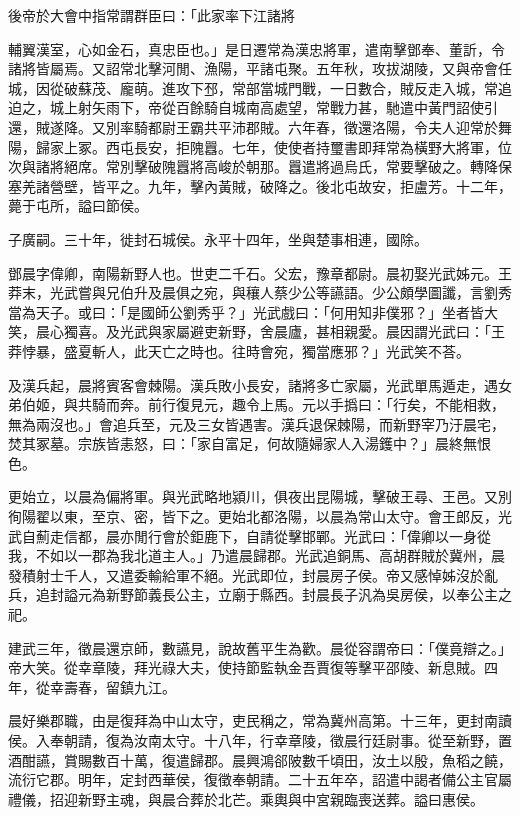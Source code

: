 \begin{pinyinscope}
後帝於大會中指常謂群臣曰：「此家率下江諸將

輔翼漢室，心如金石，真忠臣也。」是日遷常為漢忠將軍，遣南擊鄧奉、董訢，令諸將皆屬焉。又詔常北擊河閒、漁陽，平諸屯聚。五年秋，攻拔湖陵，又與帝會任城，因從破蘇茂、龐萌。進攻下邳，常部當城門戰，一日數合，賊反走入城，常追迫之，城上射矢雨下，帝從百餘騎自城南高處望，常戰力甚，馳遣中黃門詔使引還，賊遂降。又別率騎都尉王霸共平沛郡賊。六年春，徵還洛陽，令夫人迎常於舞陽，歸家上冢。西屯長安，拒隗囂。七年，使使者持璽書即拜常為橫野大將軍，位次與諸將絕席。常別擊破隗囂將高峻於朝那。囂遣將過烏氏，常要擊破之。轉降保塞羌諸營壁，皆平之。九年，擊內黃賊，破降之。後北屯故安，拒盧芳。十二年，薨于屯所，謚曰節侯。

子廣嗣。三十年，徙封石城侯。永平十四年，坐與楚事相連，國除。

鄧晨字偉卿，南陽新野人也。世吏二千石。父宏，豫章都尉。晨初娶光武姊元。王莽末，光武嘗與兄伯升及晨俱之宛，與穰人蔡少公等讌語。少公頗學圖讖，言劉秀當為天子。或曰：「是國師公劉秀乎？」光武戲曰：「何用知非僕邪？」坐者皆大笑，晨心獨喜。及光武與家屬避吏新野，舍晨廬，甚相親愛。晨因謂光武曰：「王莽悖暴，盛夏斬人，此天亡之時也。往時會宛，獨當應邪？」光武笑不荅。

及漢兵起，晨將賓客會棘陽。漢兵敗小長安，諸將多亡家屬，光武單馬遁走，遇女弟伯姬，與共騎而奔。前行復見元，趣令上馬。元以手撝曰：「行矣，不能相救，無為兩沒也。」會追兵至，元及三女皆遇害。漢兵退保棘陽，而新野宰乃汙晨宅，焚其冢墓。宗族皆恚怒，曰：「家自富足，何故隨婦家人入湯鑊中？」晨終無恨色。

更始立，以晨為偏將軍。與光武略地潁川，俱夜出昆陽城，擊破王尋、王邑。又別徇陽翟以東，至京、密，皆下之。更始北都洛陽，以晨為常山太守。會王郎反，光武自薊走信都，晨亦閒行會於鉅鹿下，自請從擊邯鄲。光武曰：「偉卿以一身從我，不如以一郡為我北道主人。」乃遣晨歸郡。光武追銅馬、高胡群賊於冀州，晨發積射士千人，又遣委輸給軍不絕。光武即位，封晨房子侯。帝又感悼姊沒於亂兵，追封謚元為新野節義長公主，立廟于縣西。封晨長子汎為吳房侯，以奉公主之祀。

建武三年，徵晨還京師，數讌見，說故舊平生為歡。晨從容謂帝曰：「僕竟辯之。」帝大笑。從幸章陵，拜光祿大夫，使持節監執金吾賈復等擊平邵陵、新息賊。四年，從幸壽春，留鎮九江。

晨好樂郡職，由是復拜為中山太守，吏民稱之，常為冀州高第。十三年，更封南讀侯。入奉朝請，復為汝南太守。十八年，行幸章陵，徵晨行廷尉事。從至新野，置酒酣讌，賞賜數百十萬，復遣歸郡。晨興鴻郤陂數千頃田，汝土以殷，魚稻之饒，流衍它郡。明年，定封西華侯，復徵奉朝請。二十五年卒，詔遣中謁者備公主官屬禮儀，招迎新野主魂，與晨合葬於北芒。乘輿與中宮親臨喪送葬。謚曰惠侯。


\end{pinyinscope}
